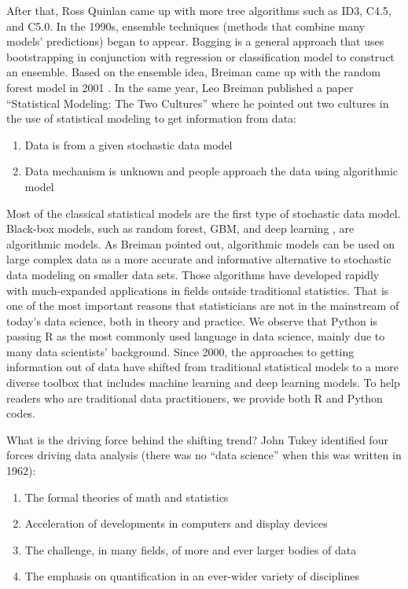 \documentclass[
  12pt,
]{krantz}
\providecommand{\tightlist}{%
  \setlength{\itemsep}{0pt}\setlength{\parskip}{0pt}}
\begin{document}
After that, Ross Quinlan came up with more tree algorithms such as ID3, C4.5, and C5.0. In the 1990s, ensemble techniques (methods that combine many models' predictions) began to appear. Bagging is a general approach that uses bootstrapping in conjunction with regression or classification model to construct an ensemble. Based on the ensemble idea, Breiman came up with the random forest  model in 2001 \citep{Breiman2001}. In the same year, Leo Breiman published a paper ``Statistical Modeling: The Two Cultures'' \citep{Breiman2001TwoCulture} where he pointed out two cultures in the use of statistical modeling to get information from data:

\begin{enumerate}
\def\labelenumi{(\arabic{enumi})}
\tightlist
\item
  Data is from a given stochastic data model
\item
  Data mechanism is unknown and people approach the data using algorithmic model
\end{enumerate}

Most of the classical statistical models are the first type of stochastic data model. Black-box models, such as random forest, GBM, and deep learning   , are algorithmic models. As Breiman pointed out, algorithmic models can be used on large complex data as a more accurate and informative alternative to stochastic data modeling on smaller data sets. Those algorithms have developed rapidly with much-expanded applications in fields outside traditional statistics. That is one of the most important reasons that statisticians are not in the mainstream of today's data science, both in theory and practice. We observe that Python is passing R as the most commonly used language in data science, mainly due to many data scientists' background. Since 2000, the approaches to getting information out of data have shifted from traditional statistical models to a more diverse toolbox that includes machine learning and deep learning models. To help readers who are traditional data practitioners, we provide both R and Python codes.

What is the driving force behind the shifting trend? John Tukey identified four forces driving data analysis (there was no ``data science'' when this was written in 1962):

\begin{enumerate}
\def\labelenumi{\arabic{enumi}.}
\tightlist
\item
  The formal theories of math and statistics
\item
  Acceleration of developments in computers and display devices
\item
  The challenge, in many fields, of more and ever larger bodies of data
\item
  The emphasis on quantification in an ever-wider variety of disciplines
\end{enumerate}
\end{document}
